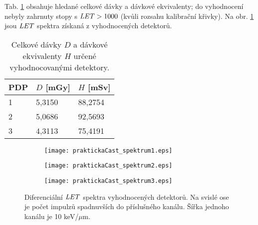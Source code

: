 Tab. \ref{tab:praktickaCast_davkyVysledky} obsahuje hledané celkové dávky a dávkové ekvivalenty; do vyhodnocení nebyly zahrnuty stopy s $\mathit{LET}>1000$ (kvůli rozsahu kalibrační křivky). Na obr. \ref{fig:praktickaCast_LETspektra} jsou $\mathit{LET}$ spektra získaná z vyhodnocených detektorů.
\begin{table}[h]
  \centering
  \caption{Celkové dávky $D$ a dávkové ekvivalenty $H$ určené vyhodnocovanými detektory.}
  \label{tab:praktickaCast_davkyVysledky}
  \begin{tabular}{lll}
	\toprule
	PDP&$D$ [mGy]&$H$ [mSv]\\
	\midrule
	1&5,3150&88,2754\\
	2&5,0686&92,5693\\
	3&4,3113&75,4191\\
	\bottomrule
  \end{tabular}
\end{table}
\begin{figure}[h]
  \centering
  \begin{subfigure}{0.49\textwidth}
	\texttt{[image: praktickaCast\_spektrum1.eps]}
	\caption{}
  \end{subfigure}
  \begin{subfigure}{0.49\textwidth}
	\texttt{[image: praktickaCast\_spektrum2.eps]}
	\caption{}
  \end{subfigure}
  \begin{subfigure}{0.49\textwidth}
	\texttt{[image: praktickaCast\_spektrum3.eps]}
	\caption{}
  \end{subfigure}
  \caption{Diferenciální $\mathit{LET}$ spektra vyhodnocených detektorů. Na svislé ose je počet impulzů spadnuvších do příslušného kanálu. Šířka jednoho kanálu je 10 keV/$\mu$m.}
  \label{fig:praktickaCast_LETspektra}
\end{figure}


